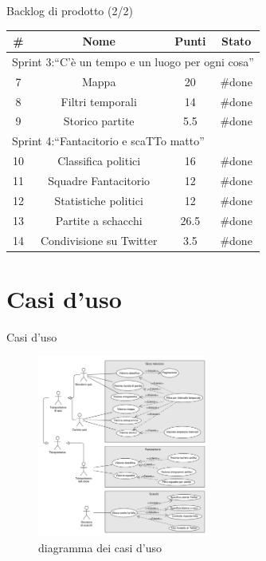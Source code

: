 \documentclass{beamer}
\begin{document}
\begin{frame}{Backlog di prodotto (2/2)}
	\begin{table}
		\begin{tabular}{|c|c|c|c|}
			\hline
			\textbf{\#} & \textbf{Nome}           & \textbf{Punti} & \textbf{Stato}    \\
			\hline
			\multicolumn{4}{|l|}{Sprint 3:``C'\`e un tempo e un luogo per ogni cosa''} \\
			\hline
			7           & Mappa                   & 20             & \#done            \\
			\hline
			8           & Filtri temporali        & 14             & \#done            \\
			\hline
			9           & Storico partite         & 5.5            & \#done            \\
			\hline
			\multicolumn{4}{|l|}{Sprint 4:``Fantacitorio e scaTTo matto''}             \\
			\hline
			10          & Classifica politici     & 16             & \#done            \\
			\hline
			11          & Squadre Fantacitorio    & 12             & \#done            \\
			\hline
			12          & Statistiche politici    & 12             & \#done            \\
			\hline
			13          & Partite a schacchi      & 26.5           & \#done            \\
			\hline
			14          & Condivisione su Twitter & 3.5            & \#done            \\
			\hline
		\end{tabular}
	\end{table}
\end{frame}

\section{Casi d'uso}
\begin{frame}{Casi d'uso}
	\begin{figure}
		\includegraphics[width=0.5\textwidth]{use-cases}
		\caption{diagramma dei casi d'uso}
	\end{figure}
\end{frame}
\end{document}
